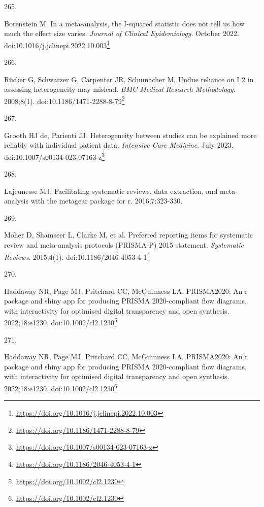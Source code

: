 \documentclass[
  a4paper,
]{book}
\newlength{\cslhangindent}
\newlength{\csllabelwidth}
\newlength{\cslentryspacingunit} %
\newenvironment{CSLReferences}[2] %
 {%
  \setlength{\parindent}{0pt}
  \ifodd #1
  \let\oldpar\par
  \def\par{\hangindent=\cslhangindent\oldpar}
  \fi
  \setlength{\parskip}{#2\cslentryspacingunit}
 }%
 {}
\newcommand{\CSLLeftMargin}[1]{\parbox[t]{\csllabelwidth}{#1}}
\newcommand{\CSLRightInline}[1]{\parbox[t]{\linewidth - \csllabelwidth}{#1}\break}
\renewcommand{\href}[2]{#2\footnote{\url{#1}}}
\begin{document}
\begin{CSLReferences}{0}{0}
\leavevmode{}%
\CSLLeftMargin{265. }%
\CSLRightInline{Borenstein M. In a meta-analysis, the I-squared statistic does not tell us how much the effect size varies. \emph{Journal of Clinical Epidemiology}. October 2022. doi:\href{https://doi.org/10.1016/j.jclinepi.2022.10.003}{10.1016/j.jclinepi.2022.10.003}}

\leavevmode{}%
\CSLLeftMargin{266. }%
\CSLRightInline{Rücker G, Schwarzer G, Carpenter JR, Schumacher M. Undue reliance on I 2 in assessing heterogeneity may mislead. \emph{BMC Medical Research Methodology}. 2008;8(1). doi:\href{https://doi.org/10.1186/1471-2288-8-79}{10.1186/1471-2288-8-79}}

\leavevmode{}%
\CSLLeftMargin{267. }%
\CSLRightInline{Grooth HJ de, Parienti JJ. Heterogeneity between studies can be explained more reliably with individual patient data. \emph{Intensive Care Medicine}. July 2023. doi:\href{https://doi.org/10.1007/s00134-023-07163-z}{10.1007/s00134-023-07163-z}}

\leavevmode{}%
\CSLLeftMargin{268. }%
\CSLRightInline{Lajeunesse MJ. Facilitating systematic reviews, data extraction, and meta-analysis with the metagear package for r. 2016;7:323-330.}

\leavevmode{}%
\CSLLeftMargin{269. }%
\CSLRightInline{Moher D, Shamseer L, Clarke M, et al. Preferred reporting items for systematic review and meta-analysis protocols (PRISMA-P) 2015 statement. \emph{Systematic Reviews}. 2015;4(1). doi:\href{https://doi.org/10.1186/2046-4053-4-1}{10.1186/2046-4053-4-1}}

\leavevmode{}%
\CSLLeftMargin{270. }%
\CSLRightInline{Haddaway NR, Page MJ, Pritchard CC, McGuinness LA. PRISMA2020: An r package and shiny app for producing PRISMA 2020-compliant flow diagrams, with interactivity for optimised digital transparency and open synthesis. 2022;18:e1230. doi:\href{https://doi.org/10.1002/cl2.1230}{10.1002/cl2.1230}}

\leavevmode{}%
\CSLLeftMargin{271. }%
\CSLRightInline{Haddaway NR, Page MJ, Pritchard CC, McGuinness LA. PRISMA2020: An r package and shiny app for producing PRISMA 2020-compliant flow diagrams, with interactivity for optimised digital transparency and open synthesis. 2022;18:e1230. doi:\href{https://doi.org/10.1002/cl2.1230}{10.1002/cl2.1230}}


\end{CSLReferences}
\end{document}

